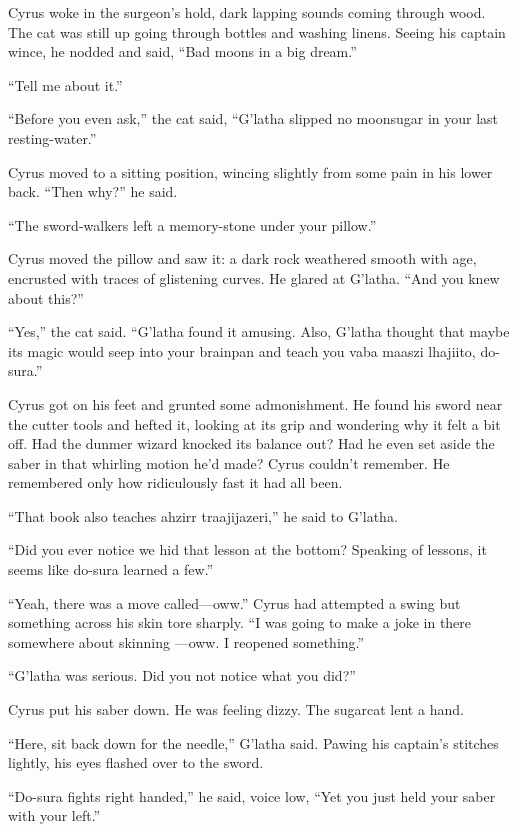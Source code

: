 \parabreak

Cyrus woke in the surgeon’s hold, dark lapping sounds coming through wood. The cat was still up going through bottles and washing linens. Seeing his captain wince, he nodded and said, “Bad moons in a big dream.”

“Tell me about it.”

“Before you even ask,” the cat said, “G’latha slipped no moonsugar in your last resting-water.”

Cyrus moved to a sitting position, wincing slightly from some pain in his lower back. “Then why?” he said.

“The sword-walkers left a memory-stone under your pillow.”

Cyrus moved the pillow and saw it: a dark rock weathered smooth with age, encrusted with traces of glistening curves. He glared at G’latha. “And you knew about this?”

“Yes,” the cat said. “G’latha found it amusing. Also, G’latha thought that maybe its magic would seep into your brainpan and teach you vaba maaszi lhajiito, do-sura.”

Cyrus got on his feet and grunted some admonishment. He found his sword near the cutter tools and hefted it, looking at its grip and wondering why it felt a bit off. Had the dunmer wizard knocked its balance out? Had he even set aside the saber in that whirling motion he’d made? Cyrus couldn’t remember. He remembered only how ridiculously fast it had all been.

“That book also teaches ahzirr traajijazeri,” he said to G’latha.

“Did you ever notice we hid that lesson at the bottom? Speaking of lessons, it seems like do-sura learned a few.”

“Yeah, there was a move called—oww.” Cyrus had attempted a swing but something across his skin tore sharply. “I was going to make a joke in there somewhere about skinning —oww. I reopened something.”

“G’latha was serious. Did you not notice what you did?”

Cyrus put his saber down. He was feeling dizzy. The sugarcat lent a hand.

“Here, sit back down for the needle,” G’latha said. Pawing his captain’s stitches lightly, his eyes flashed over to the sword.

“Do-sura fights right handed,” he said, voice low, “Yet you just held your saber with your left.”

\parabreak

